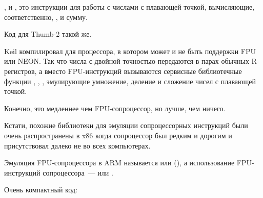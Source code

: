 ,  и , это инструкции для работы с числами 
с плавающей точкой, вычисляющие, соответственно, ,  и сумму.

Код для Thumb-2 такой же.




Keil компилировал для процессора, в котором может и не быть поддержки FPU или NEON.
Так что числа с двойной точностью передаются в парах обычных R-регистров,
а вместо FPU-инструкций вызываются сервисные библиотечные функции
, , , эмулирующие умножение, деление и сложение чисел с плавающей точкой.

Конечно, это медленнее чем FPU-сопроцессор, но лучше, чем ничего.

Кстати, похожие библиотеки для эмуляции сопроцессорных инструкций были очень распространены в x86 
когда сопроцессор был редким и дорогим и присутствовал далеко не во всех компьютерах.

Эмуляция FPU-сопроцессора в ARM называется  или  (),
а использование FPU-инструкций сопроцессора~---  или .

\iffalse
\myindex{Raspberry Pi}
Ядро Linux, например, для Raspberry Pi может поставляться в двух вариантах.

В случае \IT{soft float}, аргументы будут передаваться через R-регистры, 
а в случае \IT{hard float}, через D-регистры.


И это то, что помешает использовать, например, armhf-библиотеки
из armel-кода или наоборот, поэтому, весь код в дистрибутиве Linux должен быть скомпилирован
в соответствии с выбранным соглашением о вызовах.

\fi


Очень компактный код:




